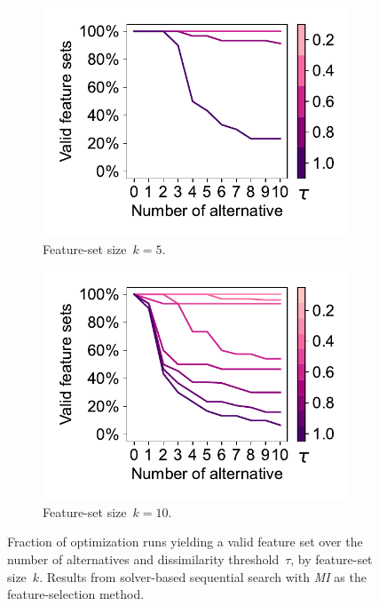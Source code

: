 \documentclass{article}
\theoremstyle{definition}
\begin{document}
\begin{figure}[t]
	\centering
	\begin{subfigure}[t]{0.48\textwidth}
		\centering
		\includegraphics[width=\textwidth, trim=15 15 10 15, clip]{plots/afs-impact-num-alternatives-tau-optimization-status-k-5.pdf}
		\caption{Feature-set size~$k=5$.}
		\label{fig:afs:impact-num-alternatives-tau-optimization-status-k-5}
	\end{subfigure}
	\hfill
	\begin{subfigure}[t]{0.48\textwidth}
		\centering
		\includegraphics[width=\textwidth, trim=15 15 10 15, clip]{plots/afs-impact-num-alternatives-tau-optimization-status-k-10.pdf}
		\caption{Feature-set size~$k=10$.}
		\label{fig:afs:impact-num-alternatives-tau-optimization-status-k-10}
	\end{subfigure}
	\caption{
		Fraction of optimization runs yielding a valid feature set over the number of alternatives and dissimilarity threshold~$\tau$, by feature-set size~$k$.
		Results from solver-based sequential search with \emph{MI} as the feature-selection method.
	}
	\label{fig:afs:impact-num-alternatives-tau-optimization-status}
\end{figure}
\end{document}
